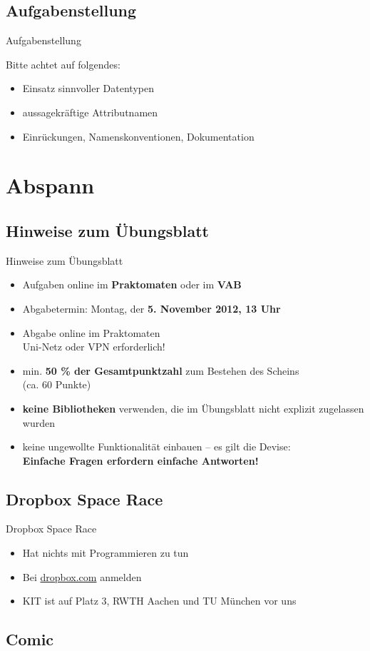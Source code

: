 \documentclass[usepdftitle=false,hyperref={pdfpagelabels=false}]{beamer}
\begin{document}
\subsection{Aufgabenstellung}
\begin{frame}{Aufgabenstellung}
    \begin{alertblock}{Bitte achtet auf folgendes:}
        \begin{itemize}
            \item Einsatz sinnvoller Datentypen
            \item aussagekräftige Attributnamen
            \item Einrückungen, Namenskonventionen, Dokumentation
        \end{itemize}
    \end{alertblock}
\end{frame}

\section{Abspann}
\subsection{Hinweise zum Übungsblatt}
    \begin{frame}{Hinweise zum Übungsblatt}
    \begin{itemize}
        \item Aufgaben online im \textbf{Praktomaten} oder im \textbf{VAB}
        \item Abgabetermin: Montag, der \textbf{5. November 2012, 13 Uhr}
        \item Abgabe online im Praktomaten\\
              Uni-Netz oder VPN erforderlich!
        \item min. \textbf{50 \% der Gesamtpunktzahl} zum Bestehen des Scheins\\
              (ca. 60 Punkte)
        \item \textbf{keine Bibliotheken} verwenden, die im Übungsblatt nicht explizit zugelassen wurden
        \item keine ungewollte Funktionalität einbauen – es gilt die Devise:\\ \textbf{Einfache Fragen erfordern einfache Antworten!}
    \end{itemize}
\end{frame}

\subsection{Dropbox Space Race}
    \begin{frame}{Dropbox Space Race}
    \begin{itemize}
        \item Hat nichts mit Programmieren zu tun
        \item Bei \href{https://www.dropbox.com/spacerace}{dropbox.com} anmelden
        \item KIT ist auf Platz 3, RWTH Aachen und TU München vor uns
    \end{itemize}
\end{frame}

\subsection{Comic}
\end{document}
